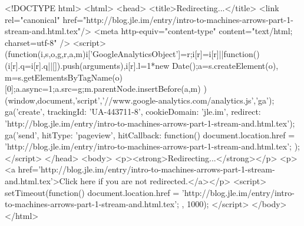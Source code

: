 <!DOCTYPE html>
<html>
<head>
<title>Redirecting...</title>
<link rel="canonical" href="http://blog.jle.im/entry/intro-to-machines-arrows-part-1-stream-and.html.tex"/>
<meta http-equiv="content-type" content="text/html; charset=utf-8" />
<script>
(function(i,s,o,g,r,a,m){i['GoogleAnalyticsObject']=r;i[r]=i[r]||function(){
(i[r].q=i[r].q||[]).push(arguments)},i[r].l=1*new Date();a=s.createElement(o),
m=s.getElementsByTagName(o)[0];a.async=1;a.src=g;m.parentNode.insertBefore(a,m)
})(window,document,'script','//www.google-analytics.com/analytics.js','ga');
ga('create', { trackingId: 'UA-443711-8', cookieDomain: 'jle.im', redirect: 'http://blog.jle.im/entry/intro-to-machines-arrows-part-1-stream-and.html.tex'});
ga('send', { hitType: 'pageview', hitCallback: function() { document.location.href = 'http://blog.jle.im/entry/intro-to-machines-arrows-part-1-stream-and.html.tex'; } });
</script>
</head>
<body>
  <p><strong>Redirecting...</strong></p>
  <p><a href='http://blog.jle.im/entry/intro-to-machines-arrows-part-1-stream-and.html.tex'>Click here if you are not redirected.</a></p>
  <script>
    setTimeout(function() { document.location.href = 'http://blog.jle.im/entry/intro-to-machines-arrows-part-1-stream-and.html.tex'; }, 1000);
  </script>
</body>
</html>

